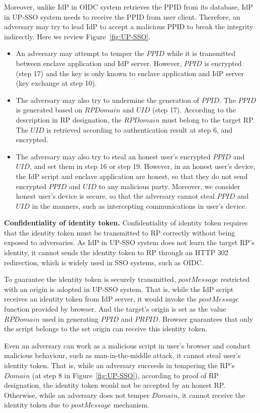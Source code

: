 Moreover, unlike IdP in OIDC system retrieves the PPID from its database, IdP in UP-SSO system needs to receive the PPID from user client. Therefore, an adversary may try to lead IdP to accept a malicious PPID to break the integrity indirectly. 
Here we review Figure~\ref{fig:UP-SSO}. 
\begin{itemize}
\item An adversary may attempt to temper the $PPID$ while it is transmitted between enclave application and IdP server. However, $PPID$ is encrypted (step 17) and the key is only known to enclave application and IdP server (key exchange at step 10).
\item The adversary may also try to undermine the generation of $PPID$. 
The $PPID$ is generated based on $RPDomain$ and $UID$ (step 17). According to the description in RP designation, the $RPDomain$ must belong to the target RP. The $UID$ is retrieved according to authentication result at step 6, and encrypted.
\item The adversary may also try to steal an honest user's encrypted $PPID$ and $UID$, and set them in step 16 or step 19. However, in an honest user's device, the IdP script and enclave application are honest, so that they do not send encrypted $PPID$ and $UID$ to any malicious party. Moreover, we consider honest user's device is secure, so that the adversary cannot steal $PPID$ and $UID$ in the manners, such as intercepting communications in user's device.
\end{itemize}


\vspace{3mm}\noindent\textbf{Confidentiality of identity token.}
Confidentiality of identity token requires that the identity token must be transmitted to RP correctly without being exposed to adversaries.
As IdP in UP-SSO system does not learn the target RP's identity, it cannot sends the identity token to RP through an HTTP 302 redirection, which is widely used in SSO systems, such as OIDC. 

To guarantee the identity token is securely transmitted, $postMessage$ restricted with an origin is adopted in UP-SSO system. That is, while the IdP script receives an identity token from IdP server, it would invoke the $postMessage$ function provided by browser. And the target's origin is set as the value $RPDomain$ used in generating $PPID$ and $PRPID$. Browser guarantees that only the script belongs to the set origin can receive this identity token.

Even an adversary can work as a malicious script in user's browser and conduct malicious behaviour, such as man-in-the-middle attack, it cannot steal user's identity token. That is, while an adversary succeeds in tempering the RP's $Domain$ (at step 8 in Figure~\ref{fig:UP-SSO}), according to proof of RP designation, the identity token would not be accepted by an honest RP. Otherwise, while an adversary does not temper $Domain$, it cannot receive the identity token due to $postMessage$ mechanism.



